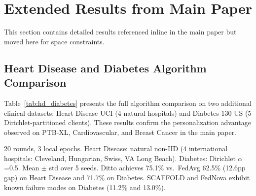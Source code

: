 \documentclass[conference,a4paper]{IEEEtran}
\begin{document}
\section{Extended Results from Main Paper}
\label{sec:main_extended}

This section contains detailed results referenced inline in the main paper but moved here for space constraints.

\subsection{Heart Disease and Diabetes Algorithm Comparison}

Table~\ref{tab:hd_diabetes} presents the full algorithm comparison on two additional clinical datasets: Heart Disease UCI (4 natural hospitals) and Diabetes 130-US (5 Dirichlet-partitioned clients). These results confirm the personalization advantage observed on PTB-XL, Cardiovascular, and Breast Cancer in the main paper.

\begin{table}[htbp]
\centering
\caption{FL Algorithm Comparison on Heart Disease and Diabetes}
\label{tab:hd_diabetes}

\vspace{1mm}
\footnotesize{20 rounds, 3 local epochs. Heart Disease: natural non-IID (4 international hospitals: Cleveland, Hungarian, Swiss, VA Long Beach). Diabetes: Dirichlet $\alpha$=0.5. Mean $\pm$ std over 5 seeds. Ditto achieves 75.1\% vs.\ FedAvg 62.5\% (12.6pp gap) on Heart Disease and 71.7\% on Diabetes. SCAFFOLD and FedNova exhibit known failure modes on Diabetes (11.2\% and 13.0\%).}
\end{table}
\end{document}
